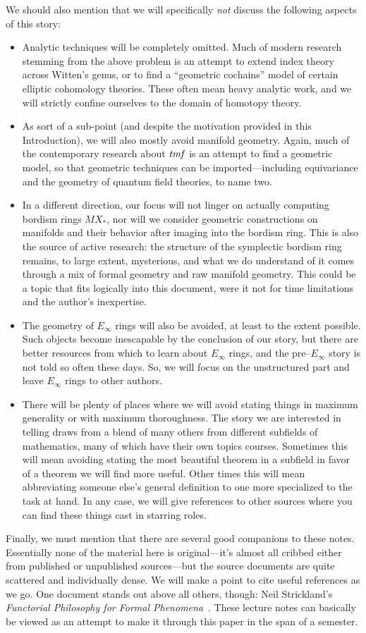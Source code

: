 We should also mention that we will specifically \emph{not} discuss the following aspects of this story:
\begin{itemize}
\item Analytic techniques will be completely omitted.  Much of modern research stemming from the above problem is an attempt to extend index theory across Witten's genus, or to find a ``geometric cochains'' model of certain elliptic cohomology theories.  These often mean heavy analytic work, and we will strictly confine ourselves to the domain of homotopy theory.
\item As sort of a sub-point (and despite the motivation provided in this Introduction), we will also mostly avoid manifold geometry.  Again, much of the contemporary research about $\mathit{tmf}$ is an attempt to find a geometric model, so that geometric techniques can be imported---including equivariance and the geometry of quantum field theories, to name two.
\item In a different direction, our focus will not linger on actually computing bordism rings $MX_*$, nor will we consider geometric constructions on manifolds and their behavior after imaging into the bordism ring.  This is also the source of active research: the structure of the symplectic bordism ring remains, to large extent, mysterious, and what we do understand of it comes through a mix of formal geometry and raw manifold geometry.  This could be a topic that fits logically into this document, were it not for time limitations and the author's inexpertise.
\item The geometry of $E_\infty$ rings will also be avoided, at least to the extent possible.  Such objects become inescapable by the conclusion of our story, but there are better resources from which to learn about $E_\infty$ rings, and the pre--$E_\infty$ story is not told so often these days.  So, we will focus on the unstructured part and leave $E_\infty$ rings to other authors.
\item There will be plenty of places where we will avoid stating things in maximum generality or with maximum thoroughness.  The story we are interested in telling draws from a blend of many others from different subfields of mathematics, many of which have their own topics courses.  Sometimes this will mean avoiding stating the most beautiful theorem in a subfield in favor of a theorem we will find more useful.  Other times this will mean abbreviating someone else's general definition to one more specialized to the task at hand.  In any case, we will give references to other sources where you can find these things cast in starring roles.
\end{itemize}

Finally, we must mention that there are several good companions to these notes.  Essentially none of the material here is original---it's almost all cribbed either from published or unpublished sources---but the source documents are quite scattered and individually dense.  We will make a point to cite useful references as we go.  One document stands out above all others, though: Neil Strickland's \textit{Functorial Philosophy for Formal Phenomena}~\cite{StricklandFPFP}.  These lecture notes can basically be viewed as an attempt to make it through this paper in the span of a semester.
